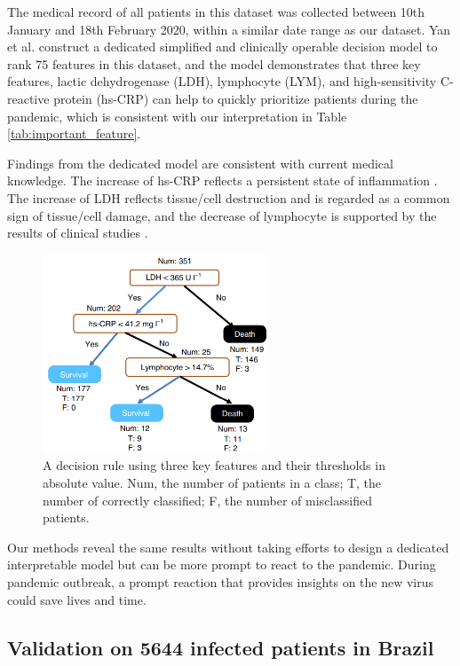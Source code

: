 The medical record of all patients in this dataset was collected between 10th January and 18th February 2020, within a similar date range as our dataset. Yan et al. construct a dedicated simplified and clinically operable decision model to rank 75 features in this dataset, and the model demonstrates that three key features, lactic dehydrogenase (LDH), lymphocyte (LYM), and high-sensitivity C-reactive protein (hs-CRP) can help to quickly prioritize patients during the pandemic, which is consistent with our interpretation in Table \ref{tab:important_feature}.

Findings from the dedicated model are consistent with current medical knowledge. The increase of hs-CRP reflects a persistent state of inflammation \citep{pmid19411291}. The increase of LDH reflects tissue/cell destruction and is regarded as a common sign of tissue/cell damage, and the decrease of lymphocyte is supported by the results of clinical studies \citep{chen2020epidemiological}.

\begin{figure}[H]
\centering
\includegraphics[width=0.6\textwidth]{figures/chapter_interp/nature_dt.png}
\caption{A decision rule using three key features and their thresholds in
absolute value. Num, the number of patients in a class; T, the number of
correctly classified; F, the number of misclassified patients. \citep{Yan2020}}
\end{figure}

Our methods reveal the same results without taking efforts to design a dedicated interpretable model but can be more prompt to react to the pandemic. During pandemic outbreak, a prompt reaction that provides insights on the new virus could save lives and time. 

\subsection{Validation on 5644 infected patients in Brazil}

